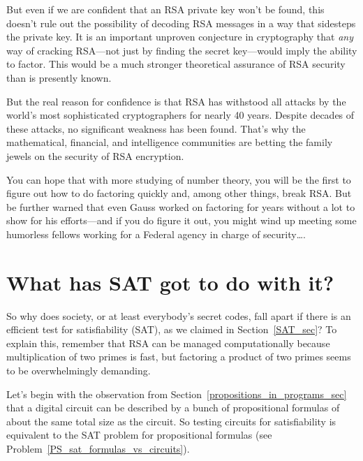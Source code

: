 But even if we are confident that an RSA private key won't be found,
this doesn't rule out the possibility of decoding RSA messages in a
way that sidesteps the private key.  It is an important unproven
conjecture in cryptography that \emph{any} way of cracking RSA---not
just by finding the secret key---would imply the ability to factor.
This would be a much stronger theoretical assurance of RSA security
than is presently known.

But the real reason for confidence is that RSA has withstood all
attacks by the world's most sophisticated cryptographers for nearly 40
years.  Despite decades of these attacks, no significant weakness has
been found.  That's why the mathematical, financial, and intelligence
communities are betting the family jewels on the security of RSA
encryption.

You can hope that with more studying of number theory, you will be the
first to figure out how to do factoring quickly and, among other
things, break RSA.  But be further warned that even Gauss worked on
factoring for years without a lot to show for his efforts---and if you
do figure it out, you might wind up meeting some humorless fellows
working for a Federal agency in charge of security\dots.

\begin{problems}
\practiceproblems
{}

\classproblems
{}

\homeworkproblems
{}
\end{problems}

\section{What has SAT got to do with it?}\label{SAT_RSA_sec}
So why does society, or at least everybody's secret codes, fall apart
if there is an efficient test for satisfiability%
(SAT), as we claimed
in Section~\ref{SAT_sec}?  To explain this, remember that RSA can be
managed computationally because multiplication of two primes is fast,
but factoring a product of two primes seems to be overwhelmingly
demanding.

Let's begin with the observation from
Section~\ref{propositions_in_programs_sec} that a digital circuit can
be described by a bunch of propositional formulas of about the same
total size as the circuit.  So testing circuits for satisfiability is
equivalent to the SAT problem for propositional formulas (see
Problem~\ref{PS_sat_formulas_vs_circuits}).

